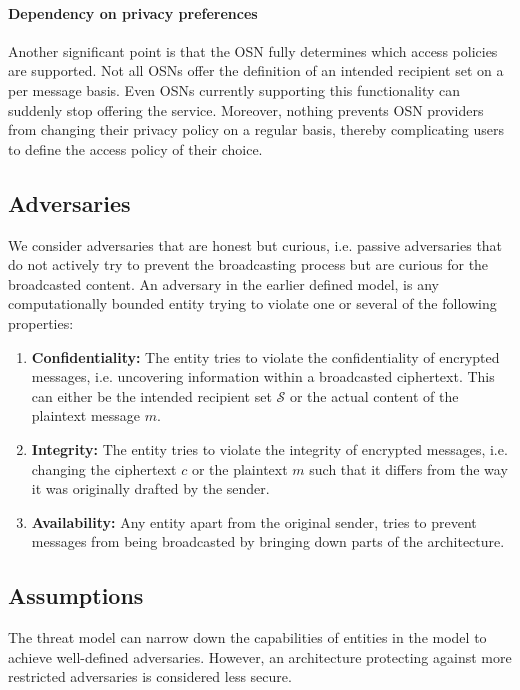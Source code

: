 \paragraph{Dependency on privacy preferences} Another significant point is that the OSN fully determines which access policies are supported. Not all OSNs offer the definition of an intended recipient set on a per message basis. Even OSNs currently supporting this functionality can suddenly stop offering the service. Moreover, nothing prevents OSN providers from changing their privacy policy on a regular basis, thereby complicating users to define the access policy of their choice.

\subsection{Adversaries}
We consider adversaries that are honest but curious, i.e. passive adversaries that do not actively try to prevent the broadcasting process but are curious for the broadcasted content. An adversary in the earlier defined model, is any computationally bounded entity trying to violate one or several of the following properties:
\begin{enumerate}
 \item \textbf{Confidentiality:} The entity tries to violate the confidentiality of encrypted messages, i.e. uncovering information within a broadcasted ciphertext. This can either be the intended recipient set $\mathcal{S}$ or the actual content of the plaintext message $m$.
 \item \textbf{Integrity:} The entity tries to violate the integrity of encrypted messages, i.e. changing the ciphertext $c$ or the plaintext $m$ such that it differs from the way it was originally drafted by the sender.
 \item \textbf{Availability:} Any entity apart from the original sender, tries to prevent messages from being broadcasted by bringing down parts of the architecture. 
\end{enumerate}

\subsection{Assumptions}
The threat model can narrow down the capabilities of entities in the model to achieve well-defined adversaries. However, an architecture protecting against more restricted adversaries is considered less secure.

